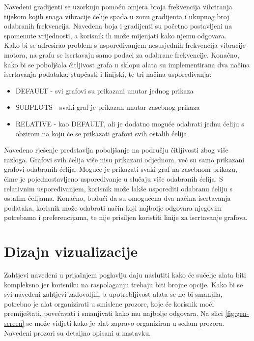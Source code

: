 \documentclass[times, utf8, diplomski]{fer}
\begin{document}
Navedeni gradijenti se uzorkuju pomoću omjera broja frekvencija vibriranja tijekom kojih snaga vibracije ćelije spada u zonu gradijenta i ukupnog broj odabranih frekvencija. Navedena boja i gradijenti su početno postavljeni na spomenute vrijednosti, a korisnik ih može mijenjati kako njemu odgovara.\\

Kako bi se adresirao problem s uspoređivanjem nesusjednih frekvencija vibracije motora, na grafu se iscrtavaju samo podaci za odabrane frekvencije. Konačno, kako bi se poboljšala čitljivost grafa u sklopu alata su implementirana dva načina iscrtavanja podataka: stupčasti i linijski, te tri načina uspoređivanja:
\begin{itemize}
\item DEFAULT - svi grafovi su prikazani unutar jednog prikaza
\item SUBPLOTS - svaki graf je prikazan unutar zasebnog prikaza
\item RELATIVE - kao DEFAULT, ali je dodatno moguće odabrati jednu ćeliju s obzirom na koju će se prikazati grafovi svih ostalih ćelija\\
\end{itemize}

Navedeno rješenje predstavlja poboljšanje na području čitljivosti zbog više razloga. Grafovi svih ćelija više nisu prikazani odjednom, već su samo prikazani grafovi odabranih ćelija. Moguće je prikazati svaki graf na zasebnom prikazu, čime je pojednostavljeno uspoređivanje u slučaju više odabranih ćelija. S relativnim uspoređivanjem, korisnik može lakše usporediti odabranu ćeliju s ostalim ćelijama. Konačno, budući da su omogućena dva načina iscrtavanja podataka, korisnik može odabrati način koji najbolje odgovara njegovim potrebama i preferencijama, te nije prisiljen koristiti linije za iscrtavanje grafova.

\chapter{Dizajn vizualizacije}

Zahtjevi navedeni u prijašnjem poglavlju daju naslutiti kako će sučelje alata biti kompleksno jer korisniku na raspolaganju trebaju biti brojne opcije. Kako bi se svi navedeni zahtjevi zadovoljili, a upotrebljivost alata se ne bi smanjila, potrebno je alat organizirati u smislene prozore, koje će korisnik moći premiještati, povećavati i smanjivati kako mu najbolje odgovara. Na slici \ref{fig:gen-screen} se može vidjeti kako je alat zapravo organiziran u sedam prozora. Navedeni prozori su detaljno opisani u nastavku.\\
\end{document}
